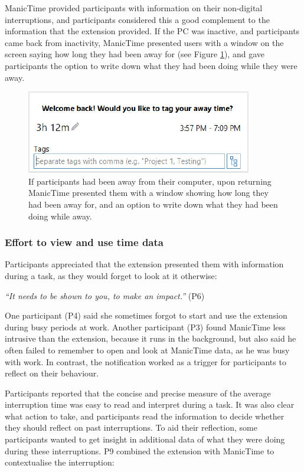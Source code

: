 ManicTime provided participants with information on their non-digital interruptions, and participants considered this a good complement to the information that the extension provided. If the PC was inactive, and participants came back from inactivity, ManicTime presented users with a window on the screen saying how long they had been away for (see Figure \ref{fig:ch56-7_mtaway}), and gave participants the option to write down what they had been doing while they were away.

\begin{figure}
\centering
\centerline{\includegraphics[scale=1]{images/ch56/ch56_MTaway.pdf}}
\caption{ If participants had been away from their computer, upon returning ManicTime presented them with a window showing how long they had been away for, and an option to write down what they had been doing while away.}
\label{fig:ch56-7_mtaway}
\end{figure}

\subsubsection{Effort to view and use time data}
Participants appreciated that the extension presented them with information during a task, as they would forget to look at it otherwise:

\textit{“It needs to be shown to you, to make an impact.”} (P6)

One participant (P4) said she sometimes forgot to start and use the extension during busy periods at work. Another participant (P3) found ManicTime less intrusive than the extension, because it runs in the background, but also said he often failed to remember to open and look at ManicTime data, as he was busy with work. In contrast, the notification worked as a trigger for participants to reflect on their behaviour.

Participants reported that the concise and precise measure of the average interruption time was easy to read and interpret during a task. It was also clear what action to take, and participants read the information to decide whether they should reflect on past interruptions. To aid their reflection, some participants wanted to get insight in additional data of what they were doing during these interruptions. P9 combined the extension with ManicTime to contextualise the interruption:

